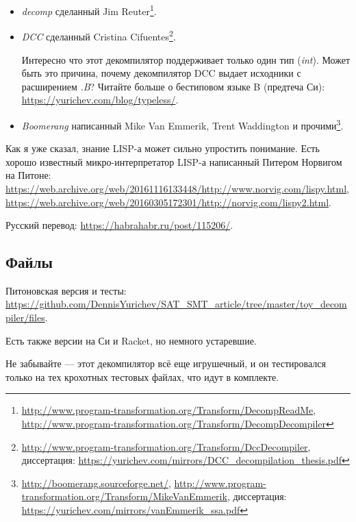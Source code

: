 \begin{itemize}
	\item \textit{decomp} сделанный Jim Reuter\footnote{
			\url{http://www.program-transformation.org/Transform/DecompReadMe},
			\url{http://www.program-transformation.org/Transform/DecompDecompiler}}.

	\item \textit{DCC} сделанный Cristina Cifuentes\footnote{
			\url{http://www.program-transformation.org/Transform/DccDecompiler},
			диссертация: \url{https://yurichev.com/mirrors/DCC_decompilation_thesis.pdf}}.

		Интересно что этот декомпилятор поддерживает только один тип (\textit{int}).
		Может быть это причина, почему декомпилятор DCC выдает исходники с расширением \textit{.B}?
		Читайте больше о бестиповом языке B (предтеча Си): \url{https://yurichev.com/blog/typeless/}.

	\item \textit{Boomerang} написанный Mike Van Emmerik, Trent Waddington и прочими\footnote{
			\url{http://boomerang.sourceforge.net/},
			\url{http://www.program-transformation.org/Transform/MikeVanEmmerik},
			диссертация: \url{https://yurichev.com/mirrors/vanEmmerik_ssa.pdf}}.
\end{itemize}

Как я уже сказал, знание LISP-а может сильно упростить понимание.
Есть хорошо известный микро-интерпретатор LISP-а написанный Питером Норвигом на Питоне:
\url{https://web.archive.org/web/20161116133448/http://www.norvig.com/lispy.html},
\url{https://web.archive.org/web/20160305172301/http://norvig.com/lispy2.html}.

Русский перевод: \url{https://habrahabr.ru/post/115206/}.

\subsection{Файлы}

Питоновская версия и тесты: \url{https://github.com/DennisYurichev/SAT_SMT_article/tree/master/toy_decompiler/files}.

Есть также версии на Си и Racket, но немного устаревшие.

Не забывайте --- этот декомпилятор всё еще игрушечный, и он тестировался только на тех крохотных тестовых файлах,
что идут в комплекте.

